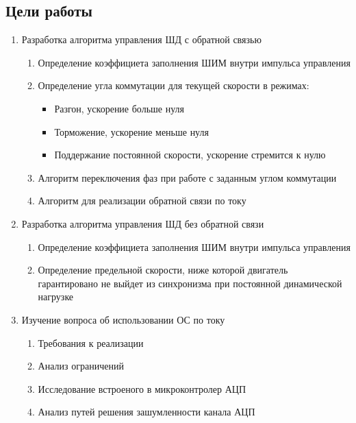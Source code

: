 \newpage
\subsection{Цели работы}

\begin{enumerate}
    \item{Разработка алгоритма управления ШД с обратной связью}
    \begin{enumerate}
        \item Определение коэффициета заполнения ШИМ внутри импульса управления
        \item Определение угла коммутации для текущей скорости в режимах:
            \begin{itemize}
                \item Разгон, ускорение больше нуля
                \item Торможение, ускорение меньше нуля
                \item Поддержание постоянной скорости, ускорение стремится к нулю
            \end{itemize}
        \item Алгоритм переключения фаз при работе с заданным углом коммутации
        \item Алгоритм для реализации обратной связи по току
    \end{enumerate}

    \item{Разработка алгоритма управления ШД без обратной связи}
        \begin{enumerate}
            \item Определение коэффициета заполнения ШИМ внутри импульса управления
            \item Определение предельной скорости, ниже которой двигатель гарантировано не выйдет из
                синхронизма при постоянной динамической нагрузке
        \end{enumerate}

    \item{Изучение вопроса об использовании ОС по току}
        \begin{enumerate}
            \item Требования к реализации
            \item Анализ ограничений
            \item Исследование встроеного в микроконтролер АЦП
            \item Анализ путей решения зашумленности канала АЦП
        \end{enumerate}


\end{enumerate}
